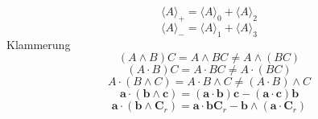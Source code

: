 \documentclass[11pt, a4paper, fleqn]{report}
\numberwithin{equation}{section}
\def\*#1{\mathbf{#1}}
\begin{document}
\begin{equation}\tag{2.1.11b}
    \langle A\rangle_+=\langle A\rangle_0+\langle A\rangle_2
\end{equation}
\begin{equation}\tag{2.1.11c}
    \langle A\rangle_-=\langle A\rangle_1+\langle A\rangle_3
\end{equation}
Klammerung
\begin{equation}\tag{2.1.12a}
    (A \wedge B)C=A \wedge BC\neq A\wedge(BC)
\end{equation}
\begin{equation}\tag{2.1.12b}
    (A \cdot B)C=A \cdot BC\neq A\cdot(BC)
\end{equation}
\setcounter{equation}{12}%
\begin{equation}
    A \cdot (B\wedge C)=A \cdot B\wedge C\neq (A\cdot B)\wedge C
\end{equation}
\begin{equation}
    \*a\cdot(\*b\wedge\*c)=(\*a\cdot\*b)\*c-(\*a\cdot\*c)\*b
\end{equation}
\begin{equation}
    \*a\cdot(\*b\wedge\*C_r)=\*a\cdot\*b\*C_r-\*b\wedge(\*a\cdot\*C_r)
\end{equation}
\end{document}
